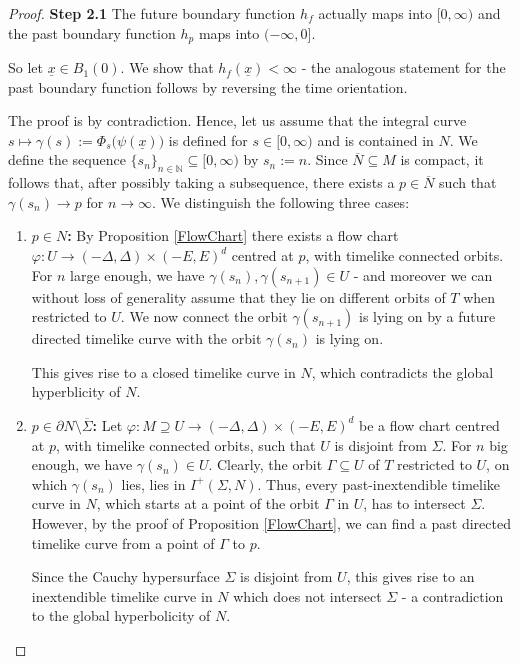 \documentclass[reqno]{article}
\newcommand{\N}{\mathbb{N}}
\newcommand{\ux}{\underline{x}}
\begin{document}
\begin{proof}
\textbf{Step 2.1} The future boundary function $h_f$ actually maps into $[0,\infty)$ and the past boundary function $h_p$ maps into $(-\infty,0]$.
\vspace*{2mm}

So let $\ux \in B_1(0)$. We show that $h_f(\ux) < \infty$ - the analogous statement for the past boundary function follows by reversing the time orientation. 

The proof is by contradiction. Hence, let us assume that the integral curve $s \mapsto \gamma(s) := \Phi_s\big(\psi(\ux)\big)$ is defined for $s \in [0,\infty)$ and is contained in $N$. We define the sequence $\{s_n\}_{n \in \N} \subseteq [0,\infty)$ by $s_n := n$. Since $\overline{N} \subseteq M$ is compact, it follows that, after possibly taking a subsequence, there exists a $p \in \overline{N}$ such that $\gamma(s_n) \to p$ for $n \to \infty$. We distinguish the following three cases:

\begin{enumerate}
\item \textbf{$p \in N$:} By Proposition \ref{FlowChart} there exists a flow chart $\varphi : U \to (-\Delta, \Delta) \times (-E,E)^d$ centred at $p$, with timelike connected orbits. 
For $n$ large enough, we have $\gamma(s_n), \gamma(s_{n+1}) \in U$ - and moreover we can without loss of generality assume that they lie on different orbits of $T$ when restricted to $U$. We now connect the orbit $\gamma(s_{n+1})$ is lying on by a future directed timelike curve with the orbit $\gamma(s_n)$ is lying on. 
\begin{center}
\def\svgwidth{6cm}

\end{center}
This gives rise to a closed timelike curve in $N$, which contradicts the global hyperblicity of $N$.


\item \textbf{$p \in \partial N \setminus \overline{\Sigma}$:}
Let $\varphi : M \supseteq U \to (-\Delta, \Delta) \times (-E,E)^d$ be a flow chart centred at $p$, with timelike connected orbits, such that $U$ is disjoint from $\Sigma$. For $n$ big enough, we have $\gamma(s_n) \in U$. Clearly, the orbit $\Gamma \subseteq U$ of $T$ restricted to $U$, on which $\gamma(s_n)$ lies, lies in $I^+(\Sigma, N)$. Thus, every past-inextendible timelike curve in $N$, which starts at a point of the orbit $\Gamma$ in $U$, has to intersect $\Sigma$. However, by the proof of Proposition \ref{FlowChart}, we can find a past directed timelike curve from a point of $\Gamma$ to $p$. 
\begin{center}
\def\svgwidth{6cm}

\end{center}
Since the Cauchy hypersurface $\Sigma$ is disjoint from $U$, this gives rise to an inextendible timelike curve in $N$ which does not intersect $\Sigma$ - a contradiction to the global hyperbolicity of $N$.



\end{enumerate}
\end{proof}
\end{document}
